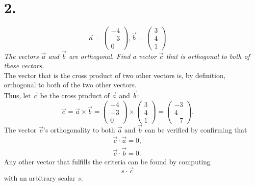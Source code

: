 \documentclass[12pt]{article}
\begin{document}
\section*{2.}
\begin{equation*}
	\vec{a} = \begin{pmatrix} -4 \\ -3 \\ 0 \end{pmatrix},
	\vec{b} = \begin{pmatrix} 3 \\ 4 \\ 1 \end{pmatrix}
\end{equation*}
\textit{The vectors $\vec{a}$ and $\vec{b}$ are orthogonal. Find a vector
$\vec{c}$ that is orthogonal to both of these vectors.} \\[\baselineskip]
The vector that is the cross product of two other vectors is, by definition,
orthogonal to both of the two other vectors. \\
Thus, let $\vec{c}$ be the cross product of $\vec{a}$ and $\vec{b}$:
\begin{equation*}
	\vec{c}
	=
	\vec{a} \times \vec{b}
	=
	\begin{pmatrix} -4 \\ -3 \\ 0 \end{pmatrix}
	\times
	\begin{pmatrix} 3 \\ 4 \\ 1 \end{pmatrix}
	=
	\boxed{
		\begin{pmatrix} -3 \\ 4 \\ -7 \end{pmatrix}
	}
	.
\end{equation*}
The vector $\vec{c}$'s orthogonality to both $\vec{a}$ and $\vec{b}$ can be
verified by confirming that
\begin{gather*}
	\vec{c} \cdot \vec{a} = 0, \\
	\vec{c} \cdot \vec{b} = 0.
\end{gather*}
Any other vector that fulfills the criteria can be found by computing
\begin{equation*}
	s \cdot \vec{c}
\end{equation*}
with an arbitrary scalar $s$.
\end{document}
